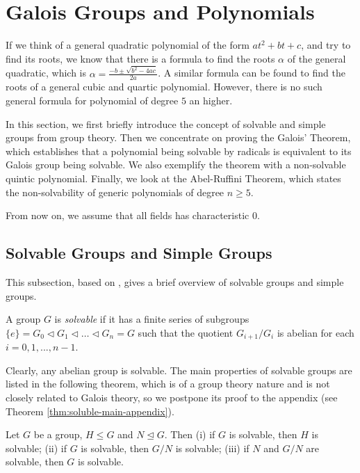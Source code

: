 \section{Galois Groups and Polynomials} \label{sec:galois-groups-and-polynomials}
If we think of a general quadratic polynomial of the form $at^2+bt+c$, and try to find its roots, we know that there is a formula to find the roots $\alpha$ of the general quadratic, which is $\alpha = \frac{-b \pm \sqrt{b^2 - 4ac}}{2a}$. A similar formula can be found to find the roots of a general cubic and quartic polynomial. However, there is no such general formula for polynomial of degree $5$ an higher.

In this section, we first briefly introduce the concept of solvable and simple groups from group theory. Then we concentrate on proving the Galois' Theorem, which establishes that a polynomial being solvable by radicals is equivalent to its Galois group being solvable. We also exemplify the theorem with a non-solvable quintic polynomial. Finally, we look at the Abel-Ruffini Theorem, which states the non-solvability of generic polynomials of degree $n \ge 5$.  

From now on, we assume that all fields has characteristic $0$.  
\subsection{Solvable Groups and Simple Groups}
This subsection, based on \cite[Chapter~14]{Stewart}, gives a brief overview of solvable groups and simple groups. 
\begin{definition} \label{def:soluble}
    A group $G$ is \textit{solvable} if it has a finite series of subgroups 
    $ \{ e \} = G_0 \triangleleft G_1 \triangleleft \dots \triangleleft G_n = G$
    such that the quotient $G_{i+1} / G_{i}$ is abelian for each $i = 0, 1, ...,  n - 1$.
\end{definition}

Clearly, any abelian group is solvable. The main properties of solvable groups are listed in the following theorem, which is of a group theory nature and is not closely related to Galois theory, so we postpone its proof to the appendix (see Theorem \ref{thm:soluble-main-appendix}). 

\begin{theorem} \label{thm:soluble-main}
    Let $G$ be a group, $H \le G$ and $N \trianglelefteq G$. Then 
    (i) if $G$ is solvable, then $H$ is solvable;
    (ii) if $G$ is solvable, then $G / N$ is solvable; 
    (iii) if $N$ and $G / N$ are solvable, then $G$ is solvable. 
\end{theorem}


